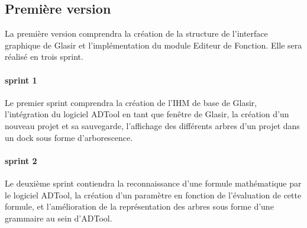 

	\subsection{ Première version }

		La première version comprendra la création de la structure de l'interface graphique de Glasir et l'implémentation du module Editeur de Fonction. Elle sera réalisé en trois sprint. 


		\paragraph{sprint 1} Le premier sprint comprendra la création de l'IHM de base de Glasir, l'intégration du logiciel ADTool en tant que fenêtre de Glasir, la création d'un nouveau projet et sa sauvegarde, l'affichage des différents arbres d'un projet dans un dock sous forme d'arborescence.


		\paragraph{sprint 2} Le deuxième sprint contiendra la reconnaissance d'une formule mathématique par le logiciel ADTool, la création d'un paramètre en fonction de l'évaluation de cette formule, et l'amélioration de la représentation des arbres sous forme d'une grammaire au sein d'ADTool.


